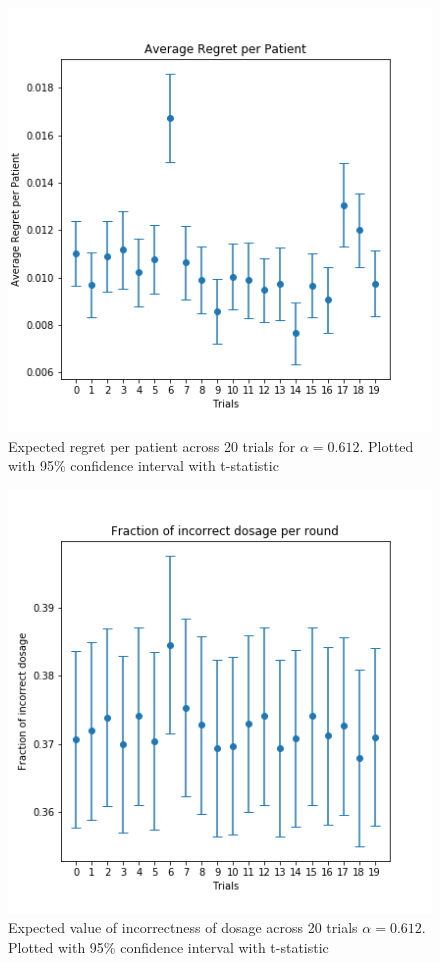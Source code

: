 \documentclass{article}
\begin{document}
\begin{figure}
	\includegraphics[width=\linewidth]{../plots/avg_regret_per_t.png}
	\caption{Expected regret per patient across 20 trials for $\alpha=0.612$. Plotted with 95\% confidence interval with t-statistic}
	\label{fig:avg_regret_per_t}
\end{figure}

\begin{figure}
	\includegraphics[width=\linewidth]{../plots/frac_incorrect_dosage_t.png}
	\caption{Expected value of incorrectness of dosage across 20 trials $\alpha=0.612$. Plotted with 95\% confidence interval with t-statistic}
	\label{fig:frac_incorrect_dosage_t}
\end{figure}
\end{document}
